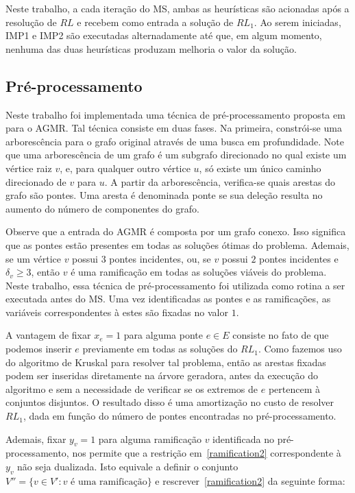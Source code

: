 \documentclass[12pt, a4paper]{article}
\theoremstyle{plain}
\theoremstyle{definition}
\theoremstyle{remark}
\begin{document}
Neste trabalho, a cada iteração do MS, ambas as heurísticas são acionadas após a resolução de $RL$ e recebem como entrada a solução de $RL_1$. Ao serem iniciadas, IMP1 e IMP2 são executadas alternadamente até que, em algum momento, nenhuma das duas heurísticas produzam melhoria o valor da solução.

\subsection{Pré-processamento}

Neste trabalho foi implementada uma técnica de pré-processamento proposta em~\cite{Marin2015} para o AGMR. Tal técnica consiste em duas fases. Na primeira, constrói-se uma arborescência para o grafo original através de uma busca em profundidade. Note que uma arborescência de um grafo é um subgrafo direcionado no qual existe um vértice raiz $v$, e, para qualquer outro vértice $u$, só existe um único caminho direcionado de $v$ para $u$. A partir da arborescência, verifica-se quais arestas do grafo são pontes. Uma aresta é denominada ponte se sua deleção resulta no aumento do número de componentes do grafo.

Observe que a entrada do AGMR é composta por um grafo conexo. Isso significa que as pontes estão presentes em todas as soluções ótimas do problema. Ademais, se um vértice $v$ possui $3$ pontes incidentes, ou, se $v$ possui $2$ pontes incidentes e $\delta_v \geq 3$, então $v$ é uma ramificação em todas as soluções viáveis do problema. Neste trabalho, essa técnica de pré-processamento foi utilizada como rotina a ser executada antes do MS. Uma vez identificadas as pontes e as ramificações, as variáveis correspondentes à estes são fixadas no valor $1$.

A vantagem de fixar $x_e = 1$ para alguma ponte $e \in E$ consiste no fato de que podemos inserir $e$ previamente em todas as soluções do $RL_1$. Como fazemos uso do algoritmo de Kruskal para resolver tal problema, então as arestas fixadas podem ser inseridas diretamente na árvore geradora, antes da execução do algoritmo e sem a necessidade de verificar se os extremos de $e$ pertencem à conjuntos disjuntos. O resultado disso é uma amortização no custo de resolver $RL_1$, dada em função do número de pontes encontradas no pré-processamento.

Ademais, fixar $y_v = 1$ para alguma ramificação $v$ identificada no pré-processamento, nos permite que a restrição em~\eqref{ramification2} correspondente à $y_v$ não seja dualizada. Isto equivale a definir o conjunto $V'' = \{v \in V': v \text{ é uma ramificação}\}$ e rescrever~\eqref{ramification2} da seguinte forma:
\end{document}
